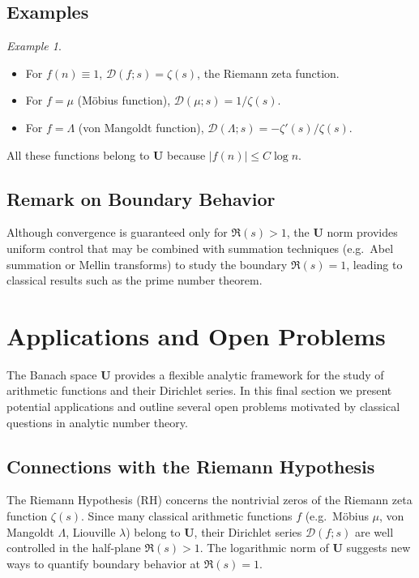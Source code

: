 \documentclass[11pt,a4paper]{article}
\theoremstyle{plain}
\theoremstyle{definition}
\theoremstyle{remark}
\newtheorem{example}[theorem]{Example}
\begin{document}
\subsection{Examples}
\begin{example}
	\begin{itemize}
		\item For $f(n)\equiv 1$, $\mathcal{D}(f;s)=\zeta(s)$, the Riemann zeta function.
		\item For $f=\mu$ (Möbius function), $\mathcal{D}(\mu;s)=1/\zeta(s)$.
		\item For $f=\Lambda$ (von Mangoldt function), $\mathcal{D}(\Lambda;s)=-\zeta'(s)/\zeta(s)$.
	\end{itemize}
	All these functions belong to $\mathbf{U}$ because
	$|f(n)|\le C\log n$.
\end{example}

\subsection{Remark on Boundary Behavior}
Although convergence is guaranteed only for $\Re(s)>1$,
the $\mathbf{U}$ norm provides uniform control
that may be combined with summation techniques
(e.g.\ Abel summation or Mellin transforms)
to study the boundary $\Re(s)=1$,
leading to classical results such as
the prime number theorem.

\section{Applications and Open Problems}

The Banach space $\mathbf{U}$ provides a flexible analytic framework
for the study of arithmetic functions and their Dirichlet series.
In this final section we present potential applications and outline
several open problems motivated by classical questions in
analytic number theory.

\subsection{Connections with the Riemann Hypothesis}

The Riemann Hypothesis (RH) concerns the nontrivial zeros of
the Riemann zeta function $\zeta(s)$.
Since many classical arithmetic functions $f$ (e.g.\ Möbius $\mu$,
von Mangoldt $\Lambda$, Liouville $\lambda$) belong to $\mathbf{U}$,
their Dirichlet series $\mathcal{D}(f;s)$ are well controlled in the
half-plane $\Re(s)>1$.
The logarithmic norm of $\mathbf{U}$ suggests new ways to
quantify boundary behavior at $\Re(s)=1$.
\end{document}
